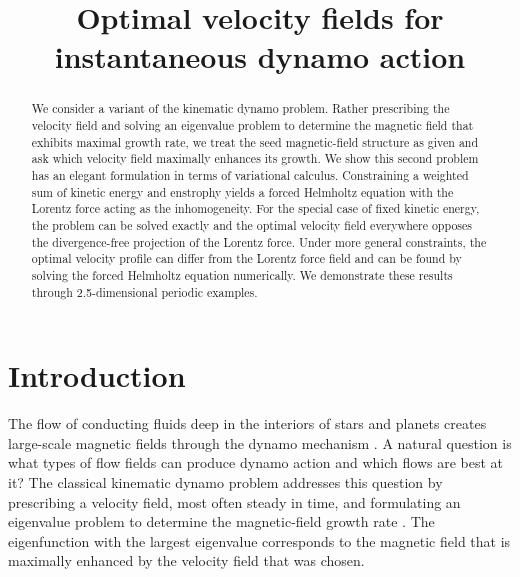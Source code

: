 \documentclass[onecolumn,showpacs,preprintnumbers,amsmath,amssymb]{revtex4-2}
\begin{document}
\title{Optimal velocity fields for instantaneous dynamo action}



\begin{abstract}
We consider a variant of the kinematic dynamo problem. Rather prescribing the velocity field and solving an eigenvalue problem to determine the magnetic field that exhibits maximal growth rate, we treat the seed magnetic-field structure as given and ask which velocity field maximally enhances its growth. We show this second problem has an elegant formulation in terms of variational calculus. Constraining a weighted sum of kinetic energy and enstrophy yields a forced Helmholtz equation with the Lorentz force acting as the inhomogeneity. For the special case of fixed kinetic energy, the problem can be solved exactly and the optimal velocity field everywhere opposes the divergence-free projection of the Lorentz force. Under more general constraints, the optimal velocity profile can differ from the Lorentz force field and can be found by solving the forced Helmholtz equation numerically. 
We demonstrate these results through 2.5-dimensional periodic examples.
\end{abstract}


\maketitle

\section{Introduction}
The flow of conducting fluids deep in the interiors of stars and planets creates large-scale magnetic fields through the dynamo mechanism \cite{Moffatt2019, Tobias2021}. A natural question is what types of flow fields can produce dynamo action and which flows are best at it? The classical kinematic dynamo problem addresses this question by prescribing a velocity field, most often steady in time, and formulating an eigenvalue problem to determine the magnetic-field growth rate \cite{Moffatt2019, Tobias2021}. The eigenfunction with the largest eigenvalue corresponds to the magnetic field that is maximally enhanced by the velocity field that was chosen.
\end{document}
